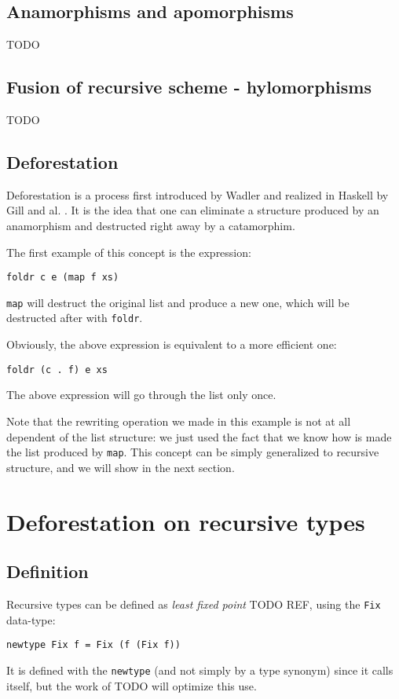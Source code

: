 \documentclass[format=sigplan]{acmart}
\newcommand{\minline}[1]{\texttt{#1}}
\begin{document}
\subsection{Anamorphisms and apomorphisms}
TODO

\subsection{Fusion of recursive scheme - hylomorphisms}
TODO

\subsection{Deforestation}
Deforestation is a process first introduced by Wadler \cite{WADLER1990231} and realized in Haskell by Gill and al. \cite{Gill:1993:SCD:165180.165214}. It is the idea that one can eliminate a structure produced by an anamorphism and destructed right away by a catamorphim.

The first example of this concept is the expression:
\begin{verbatim}
foldr c e (map f xs)
\end{verbatim}
\minline{map} will destruct the original list and produce a new one, which will be destructed after with \minline{foldr}.

Obviously, the above expression is equivalent to a more efficient one:
\begin{verbatim}
foldr (c . f) e xs
\end{verbatim}
The above expression will go through the list only once.

Note that the rewriting operation we made in this example is not at all dependent of the list structure: we just used the fact that we know how is made the list produced by \minline{map}. This concept can be simply generalized to recursive structure, and we will show in the next section.

\section{Deforestation on recursive types}
\subsection{Definition}
Recursive types can be defined as \emph{least fixed point} TODO REF, using the \minline{Fix} data-type:
\begin{verbatim}
newtype Fix f = Fix (f (Fix f))
\end{verbatim}
It is defined with the \minline{newtype} (and not simply by a type synonym) since it calls itself, but the work of TODO will optimize this use.
\end{document}
